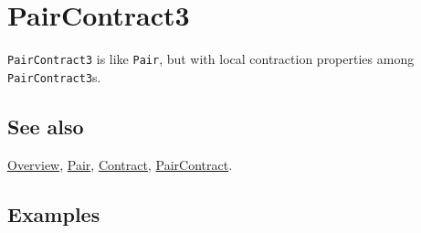 \documentclass[../FeynCalcManual.tex]{subfiles}
\begin{document}
\hypertarget{paircontract3}{%
\section{PairContract3}\label{paircontract3}}

\texttt{PairContract3} is like \texttt{Pair}, but with local contraction
properties among \texttt{PairContract3}s.

\subsection{See also}

\hyperlink{toc}{Overview}, \hyperlink{pair}{Pair},
\hyperlink{contract}{Contract}, \hyperlink{paircontract}{PairContract}.

\subsection{Examples}
\end{document}
